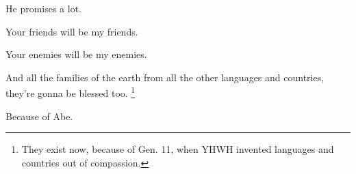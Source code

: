 {
}
{
}
{
	He promises a lot.
	
	Your friends will be my friends.
	
	Your enemies will be my enemies.

	And all the families of the earth from all the other languages and countries, they're gonna be blessed too.%
	\footnote{They exist now, because of Gen. 11, when YHWH invented languages and countries out of compassion.}

	Because of Abe.

}
